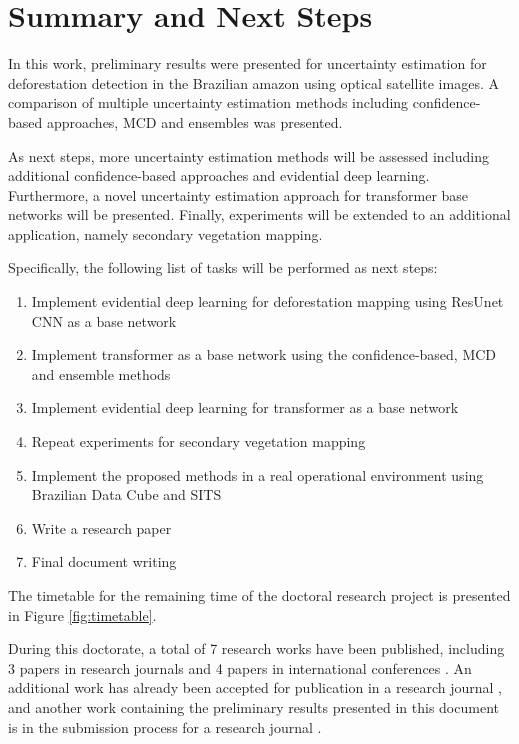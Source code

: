 \chapter{Summary and Next Steps}\label{sect:Conclusions}

In this work, preliminary results were presented for uncertainty estimation for deforestation detection in the Brazilian amazon using optical satellite images. A comparison of multiple uncertainty estimation methods including confidence-based approaches, MCD and ensembles was presented. 

As next steps, more uncertainty estimation methods will be assessed including additional confidence-based approaches and evidential deep learning. Furthermore, a novel uncertainty estimation approach for transformer base networks will be presented. Finally, experiments will be extended to an additional application, namely secondary vegetation mapping. %

Specifically, the following list of tasks will be performed as next steps:

\begin{enumerate}
\item Implement evidential deep learning for deforestation mapping using ResUnet CNN as a base network
\item Implement transformer as a base network using the confidence-based, MCD and ensemble methods
\item Implement evidential deep learning for transformer as a base network
\item Repeat experiments for secondary vegetation mapping
\item Implement the proposed methods in a real operational environment using Brazilian Data Cube and SITS
\item Write a research paper
\item Final document writing
\end{enumerate}

The timetable for the remaining time of the doctoral research project is presented in Figure \ref{fig:timetable}.

During this doctorate, a total of 7 research works have been published, including 3 papers in research journals and 4 papers in international conferences \cite{martinez2021fully, martinez2021open, chamorro2021towards, martinez2022comparison, rogozinski20223d, rogozinski2021exploring, sanches2020first}. An additional work has already been accepted for publication in a research journal \cite{10042432}, and another work containing the preliminary results presented in this document is in the submission process for a research journal \cite{chamorro2023semi}.

